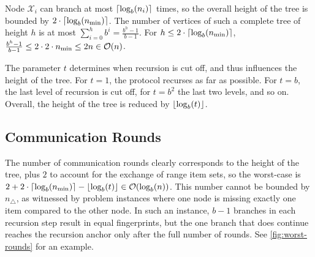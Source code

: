 Node $\mathcal{X}_i$ can branch at most $\lceil\log_{b}(n_i)\rceil$ times, so the overall height of the tree is bounded by $2 \cdot\lceil\log_{b}(n_{\min})\rceil$. The number of vertices of such a complete tree of height $h$ is at most $\sum_{i=0}^{h} b^{i} = \frac{b^{h} - 1}{b - 1}$. For $h \leq 2 \cdot\lceil\log_{b}(n_{\min})\rceil$, $\frac{b^{h} - 1}{b - 1} \leq 2 \cdot 2 \cdot n_{\min} \leq 2n \in \mathcal{O}(n)$.

The parameter $t$ determines when recursion is cut off, and thus influences the height of the tree. For $t = 1$, the protocol recurses as far as possible. For $t = b$, the last level of recursion is cut off, for $t = b^2$ the last two levels, and so on. Overall, the height of the tree is reduced by $\lfloor\log_{b}(t)\rfloor$.

\subsection{Communication Rounds}

The number of communication rounds clearly corresponds to the height of the tree, plus $2$ to account for the exchange of range item sets, so the worst-case is $2 + 2 \cdot\lceil\log_{b}(n_{\min})\rceil - \lfloor\log_{b}(t)\rfloor \in \mathcal{O}(\log_{b}(n))$. This number cannot be bounded by $n_{\triangle}$, as witnessed by problem instances where one node is missing exactly one item compared to the other node. In such an instance, $b - 1$ branches in each recursion step result in equal fingerprints, but the one branch that does continue reaches the recursion anchor only after the full number of rounds. See \cref{fig:worst-rounds} for an example.

